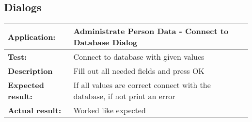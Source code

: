   \subsection{Dialogs}
   \begin{tabular}{|p{3.5cm}|p{10.5cm}|}
    \hline
     \textbf{Application:}	& Administrate Person Data - Connect to Database Dialog\\
    \hline
     \textbf{Test:}		& Connect to database with given values\\
    \hline
     \textbf{Description}	& Fill out all needed fields and press OK\\
    \hline
     \textbf{Expected result:}	& If all values are correct connect with the database, if not print an error\\
    \hline
     \textbf{Actual result:}	& Worked like expected\\
    \hline
   \end{tabular}

